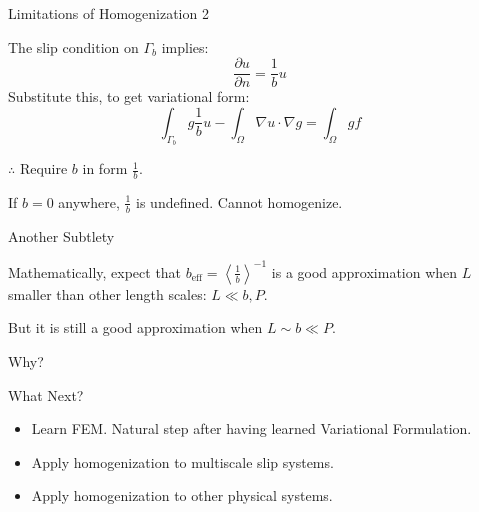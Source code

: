 \documentclass{beamer}
\newcommand{\beff}{\ensuremath{b_{\mathrm{eff}}}}
\begin{document}
\begin{frame}{Limitations of Homogenization 2}

The slip condition on $\Gamma_b$ implies:
\begin{equation}
\frac{\partial u}{\partial n} = \frac{1}{b}u
\end{equation}
Substitute this, to get variational form:
\begin{equation}
\int_{\Gamma_b} g \frac{1}{b} u 
 - \int_{\Omega} \nabla u \cdot \nabla g  
= \int_{\Omega} g f
\end{equation}


$\therefore$ Require $b$ in form $\displaystyle \frac{1}{b}$.

\vspace{1em}
If $b=0$ anywhere, $\frac{1}{b}$ is undefined. \phantom{word}Cannot homogenize.

\end{frame}


\begin{frame}{Another Subtlety}

Mathematically, expect that  $\beff = \left< \frac{1}{b} \right>^{-1}$ is a good approximation when $L$ smaller than other length scales: $L \ll b, P$.

\vspace{1em}
But it is still a good approximation when $L \sim b \ll P$.

\vspace{1em}
Why?

\vspace{1em}

\end{frame}


\begin{frame}{What Next?}
\begin{itemize}
\item Learn FEM.  Natural step after having learned Variational Formulation.
\item Apply homogenization to multiscale slip systems.
\item Apply homogenization to other physical systems.
\end{itemize}

\end{frame}
\end{document}
